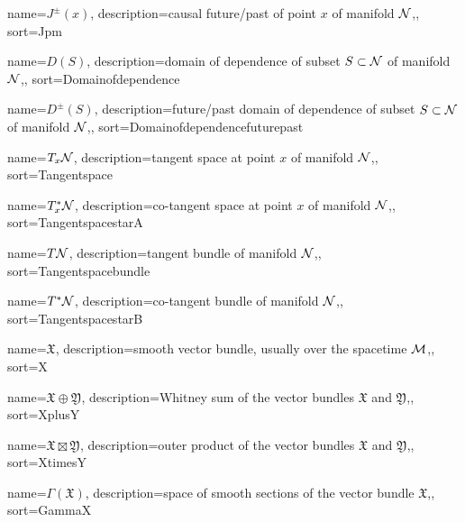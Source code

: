 


{
	name=\ensuremath{J^\pm (x)},
	description={causal future/past of point $x$ of manifold $\mathcal{N}$,},
	sort={Jpm}
}





{
	name=\ensuremath{D (S)},
	description={domain of dependence of subset $S \subset \mathcal{N}$ of manifold $\mathcal{N}$,},
	sort={Domainofdependence}
}


{
	name=\ensuremath{D^\pm (S)},
	description={future/past domain of dependence of subset $S \subset \mathcal{N}$ of manifold $\mathcal{N}$,},
	sort={Domainofdependencefuturepast}
}




{
	name=\ensuremath{T_x \N},
	description={tangent space at point $x$ of manifold $\mathcal{N}$,},
	sort={Tangentspace}
}

{
	name=\ensuremath{T^*_x \N},
	description={co-tangent space at point $x$ of manifold $\mathcal{N}$,},
	sort={TangentspacestarA}
}


{
	name=\ensuremath{T \N},
	description={tangent bundle  of manifold $\mathcal{N}$,},
	sort={Tangentspacebundle}
}

{
	name=\ensuremath{T^*\N},
	description={co-tangent bundle of manifold $\mathcal{N}$,},
	sort={TangentspacestarB}
}


{
	name=\ensuremath{\mathfrak{X}},
	description={smooth vector bundle, usually over the spacetime $\mathcal{M}$,},
	sort={X}
}


{
	name=\ensuremath{\mathfrak{X} \oplus \mathfrak{Y}},
	description={Whitney sum of the vector bundles $\mathfrak{X}$ and $\mathfrak{Y}$,},
	sort={XplusY}
}

{
	name=\ensuremath{\mathfrak{X} \boxtimes \mathfrak{Y}},
	description={outer product of the vector bundles $\mathfrak{X}$ and $\mathfrak{Y}$,},
	sort={XtimesY}
}

{
	name=\ensuremath{\Gamma(\mathfrak{X})},
	description={space of smooth sections of the vector bundle $\mathfrak{X}$,},
	sort={GammaX}
}

